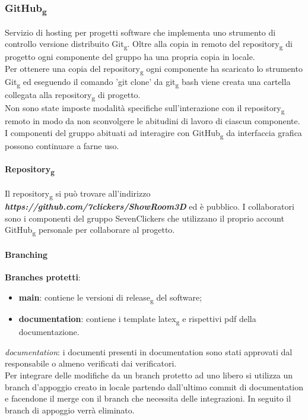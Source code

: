 \subsubsection{GitHub\textsubscript{g}}
Servizio di hosting per progetti software che implementa uno strumento di controllo versione distribuito Git\textsubscript{g}.
Oltre alla copia in remoto del repository\textsubscript{g} di progetto ogni componente del gruppo ha una propria copia in locale.\\
Per ottenere una copia del repository\textsubscript{g} ogni componente ha scaricato lo strumento Git\textsubscript{g} ed eseguendo il 
comando 'git clone' da git\textsubscript{g} bash viene creata una cartella collegata alla repository\textsubscript{g} di progetto.\\
Non sono state imposte modalità specifiche sull'interazione con il repository\textsubscript{g} remoto in modo da non sconvolgere le abitudini di lavoro di 
ciascun componente.\\
I componenti del gruppo abituati ad interagire con GitHub\textsubscript{g} da interfaccia grafica possono continuare a farne uso.
\paragraph{Repository\textsubscript{g}}
Il repository\textsubscript{g} si può trovare all'indirizzo \textbf{\textit{https://github.com/7clickers/ShowRoom3D}} ed è pubblico. 
I collaboratori sono i componenti del gruppo SevenClickers che utilizzano il proprio account GitHub\textsubscript{g} personale per collaborare al progetto.
\paragraph{Branching}
\textbf{Branches protetti}:
    \begin{itemize} 
        \item \textbf{main}: contiene le versioni di release\textsubscript{g} del software;
        \item \textbf{documentation}: contiene i template latex\textsubscript{g} e rispettivi pdf della documentazione.
    \end{itemize}
\textit{documentation}: 
i documenti presenti in documentation sono stati approvati dal responsabile o almeno verificati dai verificatori.\\
Per integrare delle modifiche da un branch protetto ad uno libero si utilizza un branch d’appoggio creato in locale partendo dall'ultimo commit di documentation e facendone il merge con il branch che necessita delle integrazioni. In seguito il branch di appoggio verrà eliminato.\\

